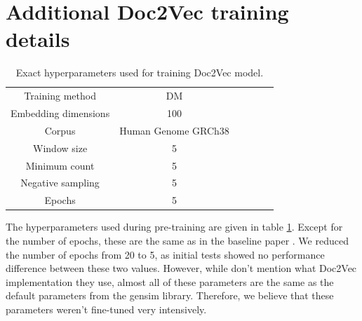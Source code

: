 %
%
%
%
%
%
%
%
%

\section{Additional Doc2Vec training details} \label{app:d2v}

\begin{table}[h!]
	\centering
	\begin{tabular}{ c c c  c c c} 
		\hline
		Training method & DM \\
		Embedding dimensions & 100 \\
		Corpus & Human Genome GRCh38 \\
		Window size & 5\\
		Minimum count & 5\\
		Negative sampling & 5\\
		Epochs & 5\\
		
		\hline
	\end{tabular}
	\caption{Exact hyperparameters used for training Doc2Vec model.
	}
	\label{table:d2vparams}
\end{table}

The hyperparameters used during pre-training are given in table \ref{table:d2vparams}. Except for the number of epochs, these are the same as in the baseline paper \cite{d2vsplicing}. We reduced the number of epochs from 20 to 5, as initial tests showed no performance difference between these two values. However, while \cite{d2vsplicing} don't mention what Doc2Vec implementation they use, almost all of these parameters are the same as the default parameters from the gensim library. Therefore, we believe that these parameters weren't fine-tuned very intensively. 

